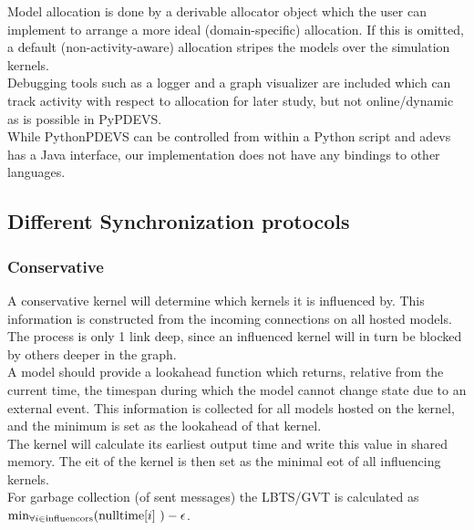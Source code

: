 Model allocation is done by a derivable allocator object which the user can implement to arrange a more ideal (domain-specific) allocation. If this is omitted, a default (non-activity-aware) allocation stripes the models over the simulation kernels.\\
Debugging tools such as a logger and a graph visualizer are included which can track activity with respect to allocation for later study, but not online/dynamic as is possible in PyPDEVS.\\
While PythonPDEVS can be controlled from within a Python script and adevs has a Java interface, our implementation does not have any bindings to other languages.

\subsection{Different Synchronization protocols}
\subsubsection{Conservative}
A conservative kernel will determine which kernels it is influenced by. This information is constructed from the incoming connections on all hosted models. The process is only 1 link deep, since an influenced kernel will in turn be blocked by others deeper in the graph.\\
A model should provide a lookahead function which returns, relative from the current time, the timespan during which the model cannot change state due to an external event. This information is collected for all models hosted on the kernel, and the minimum is set as the lookahead of that kernel. \\
The kernel will calculate its earliest output time and write this value in shared memory. The eit of the kernel is then set as the minimal eot of all influencing kernels. \\
For garbage collection (of sent messages) the LBTS/GVT is calculated as $\min_{\forall i \in \textup{influencors}}( \textup{nulltime}[i]\ )  - \epsilon $. %

